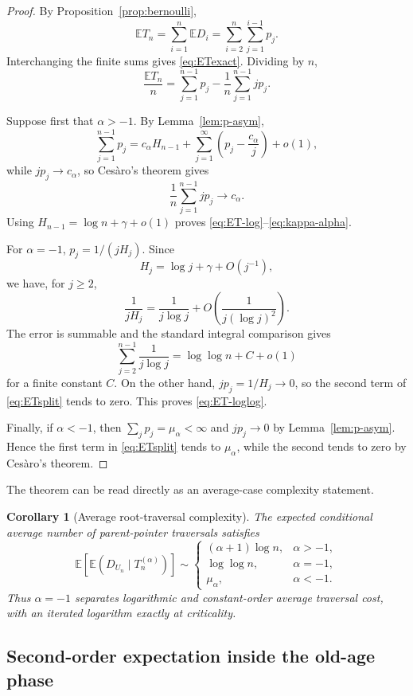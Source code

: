 \documentclass[11pt,a4paper]{article}
\newtheorem{corollary}[theorem]{Corollary}
\newcommand{\E}{\mathbb{E}}
\newcommand{\1}{\mathbf{1}}
\begin{document}
\begin{proof}
By Proposition~\ref{prop:bernoulli},
\[
\E T_n
=
\sum_{i=1}^n\E D_i
=
\sum_{i=2}^n\sum_{j=1}^{i-1}p_j.
\]
Interchanging the finite sums gives \eqref{eq:ETexact}.  Dividing by $n$,
\begin{equation}\label{eq:ETsplit}
\frac{\E T_n}{n}
=
\sum_{j=1}^{n-1}p_j
-
\frac1n\sum_{j=1}^{n-1}jp_j.
\end{equation}

Suppose first that $\alpha>-1$.  By Lemma~\ref{lem:p-asym},
\[
\sum_{j=1}^{n-1}p_j
=
c_\alpha H_{n-1}
+
\sum_{j=1}^\infty
\left(p_j-\frac{c_\alpha}{j}\right)
+o(1),
\]
while $jp_j\to c_\alpha$, so Cesàro's theorem gives
\[
\frac1n\sum_{j=1}^{n-1}jp_j\to c_\alpha.
\]
Using $H_{n-1}=\log n+\gamma+o(1)$ proves
\eqref{eq:ET-log}--\eqref{eq:kappa-alpha}.

For $\alpha=-1$, $p_j=1/(jH_j)$.  Since
\[
H_j=\log j+\gamma+O(j^{-1}),
\]
we have, for $j\ge2$,
\[
\frac1{jH_j}
=
\frac1{j\log j}
+
O\!\left(\frac1{j(\log j)^2}\right).
\]
The error is summable and the standard integral comparison gives
\[
\sum_{j=2}^{n-1}\frac1{j\log j}
=
\log\log n+C+o(1)
\]
for a finite constant $C$.  On the other hand,
$jp_j=1/H_j\to0$, so the second term of \eqref{eq:ETsplit} tends to zero.
This proves \eqref{eq:ET-loglog}.

Finally, if $\alpha<-1$, then $\sum_jp_j=\mu_\alpha<\infty$ and
$jp_j\to0$ by Lemma~\ref{lem:p-asym}.  Hence the first term in
\eqref{eq:ETsplit} tends to $\mu_\alpha$, while the second tends to zero by
Cesàro's theorem.
\end{proof}

The theorem can be read directly as an average-case complexity statement.

\begin{corollary}[Average root-traversal complexity]\label{cor:complexity}
The expected conditional average number of parent-pointer traversals satisfies
\[
\E\!\left[\E(D_{U_n}\mid T_n^{(\alpha)})\right]
\sim
\begin{cases}
(\alpha+1)\log n,&\alpha>-1,\\[1mm]
\log\log n,&\alpha=-1,\\[1mm]
\mu_\alpha,&\alpha<-1.
\end{cases}
\]
Thus $\alpha=-1$ separates logarithmic and constant-order average traversal
cost, with an iterated logarithm exactly at criticality.
\end{corollary}

\subsection{Second-order expectation inside the old-age phase}
\end{document}
